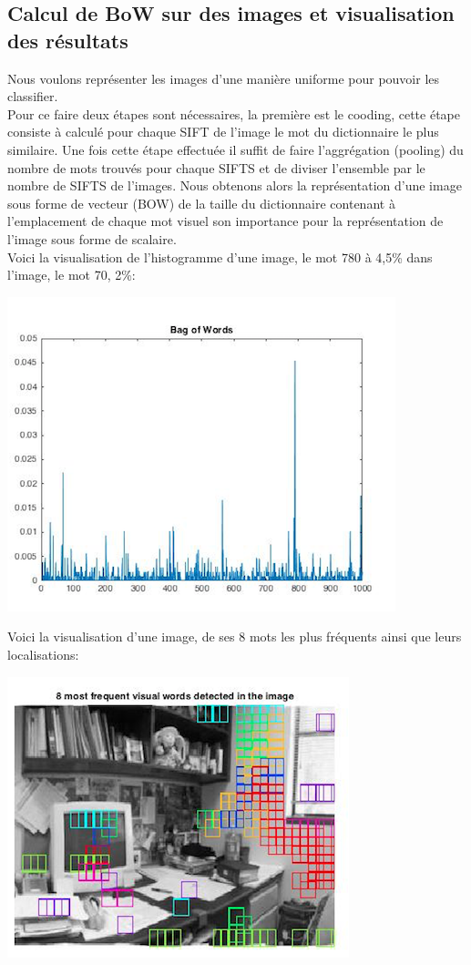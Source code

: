 \documentclass[a4paper]{article}
\begin{document}
\subsection{Calcul de BoW sur des images et visualisation des résultats}
Nous voulons représenter les images d'une manière uniforme pour pouvoir les classifier.\\
Pour ce faire deux étapes sont nécessaires, la première est le cooding, cette étape consiste à calculé pour chaque SIFT de l'image le mot du dictionnaire le plus similaire. Une fois cette étape effectuée il suffit de faire l'aggrégation (pooling) du nombre de mots trouvés pour chaque SIFTS et de diviser l'ensemble par le nombre de SIFTS de l'images. Nous obtenons alors la représentation d'une image sous forme de vecteur (BOW) de la taille du dictionnaire contenant à l'emplacement de chaque mot visuel son importance pour la représentation de l'image sous forme de scalaire.
\\
Voici la visualisation de l'histogramme d'une image, le mot 780 à 4,5\% dans l'image, le mot 70, 2\%:\\
\begin{center}
\includegraphics[scale=0.5]{bowHisto}
\end{center}

Voici la visualisation d'une image, de ses 8 mots les plus fréquents ainsi que leurs localisations:\\
\begin{center}
\includegraphics[scale=0.5]{bowLoc}
\end{center}
\end{document}
